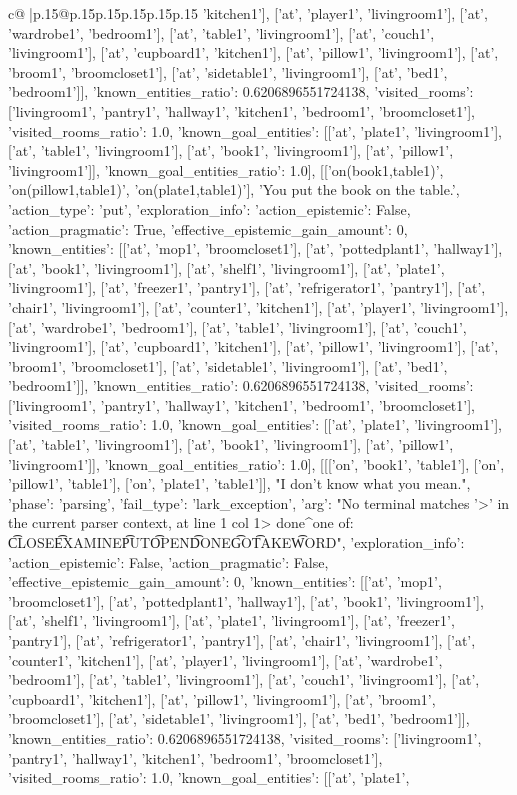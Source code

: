 \documentclass{article}
\begin{document}
{\begin{supertabular}{c@{$\;$}|p{.15\linewidth}@{}p{.15\linewidth}p{.15\linewidth}p{.15\linewidth}p{.15\linewidth}p{.15\linewidth}}
{{{'kitchen1'], ['at', 'player1', 'livingroom1'], ['at', 'wardrobe1', 'bedroom1'], ['at', 'table1', 'livingroom1'], ['at', 'couch1', 'livingroom1'], ['at', 'cupboard1', 'kitchen1'], ['at', 'pillow1', 'livingroom1'], ['at', 'broom1', 'broomcloset1'], ['at', 'sidetable1', 'livingroom1'], ['at', 'bed1', 'bedroom1']], 'known_entities_ratio': 0.6206896551724138, 'visited_rooms': ['livingroom1', 'pantry1', 'hallway1', 'kitchen1', 'bedroom1', 'broomcloset1'], 'visited_rooms_ratio': 1.0, 'known_goal_entities': [['at', 'plate1', 'livingroom1'], ['at', 'table1', 'livingroom1'], ['at', 'book1', 'livingroom1'], ['at', 'pillow1', 'livingroom1']], 'known_goal_entities_ratio': 1.0}}], [['on(book1,table1)', 'on(pillow1,table1)', 'on(plate1,table1)'], 'You put the book on the table.', {'action_type': 'put', 'exploration_info': {'action_epistemic': False, 'action_pragmatic': True, 'effective_epistemic_gain_amount': 0, 'known_entities': [['at', 'mop1', 'broomcloset1'], ['at', 'pottedplant1', 'hallway1'], ['at', 'book1', 'livingroom1'], ['at', 'shelf1', 'livingroom1'], ['at', 'plate1', 'livingroom1'], ['at', 'freezer1', 'pantry1'], ['at', 'refrigerator1', 'pantry1'], ['at', 'chair1', 'livingroom1'], ['at', 'counter1', 'kitchen1'], ['at', 'player1', 'livingroom1'], ['at', 'wardrobe1', 'bedroom1'], ['at', 'table1', 'livingroom1'], ['at', 'couch1', 'livingroom1'], ['at', 'cupboard1', 'kitchen1'], ['at', 'pillow1', 'livingroom1'], ['at', 'broom1', 'broomcloset1'], ['at', 'sidetable1', 'livingroom1'], ['at', 'bed1', 'bedroom1']], 'known_entities_ratio': 0.6206896551724138, 'visited_rooms': ['livingroom1', 'pantry1', 'hallway1', 'kitchen1', 'bedroom1', 'broomcloset1'], 'visited_rooms_ratio': 1.0, 'known_goal_entities': [['at', 'plate1', 'livingroom1'], ['at', 'table1', 'livingroom1'], ['at', 'book1', 'livingroom1'], ['at', 'pillow1', 'livingroom1']], 'known_goal_entities_ratio': 1.0}}], [[['on', 'book1', 'table1'], ['on', 'pillow1', 'table1'], ['on', 'plate1', 'table1']], "I don't know what you mean.", {'phase': 'parsing', 'fail_type': 'lark_exception', 'arg': "No terminal matches '>' in the current parser context, at line 1 col 1\n\n> done\n^\nExpected one of: \n\t* CLOSE\n\t* EXAMINE\n\t* PUT\n\t* OPEN\n\t* DONE\n\t* GO\n\t* TAKE\n\t* WORD\n", 'exploration_info': {'action_epistemic': False, 'action_pragmatic': False, 'effective_epistemic_gain_amount': 0, 'known_entities': [['at', 'mop1', 'broomcloset1'], ['at', 'pottedplant1', 'hallway1'], ['at', 'book1', 'livingroom1'], ['at', 'shelf1', 'livingroom1'], ['at', 'plate1', 'livingroom1'], ['at', 'freezer1', 'pantry1'], ['at', 'refrigerator1', 'pantry1'], ['at', 'chair1', 'livingroom1'], ['at', 'counter1', 'kitchen1'], ['at', 'player1', 'livingroom1'], ['at', 'wardrobe1', 'bedroom1'], ['at', 'table1', 'livingroom1'], ['at', 'couch1', 'livingroom1'], ['at', 'cupboard1', 'kitchen1'], ['at', 'pillow1', 'livingroom1'], ['at', 'broom1', 'broomcloset1'], ['at', 'sidetable1', 'livingroom1'], ['at', 'bed1', 'bedroom1']], 'known_entities_ratio': 0.6206896551724138, 'visited_rooms': ['livingroom1', 'pantry1', 'hallway1', 'kitchen1', 'bedroom1', 'broomcloset1'], 'visited_rooms_ratio': 1.0, 'known_goal_entities': [['at', 'plate1', }}}
\end{supertabular}}
\end{document}
